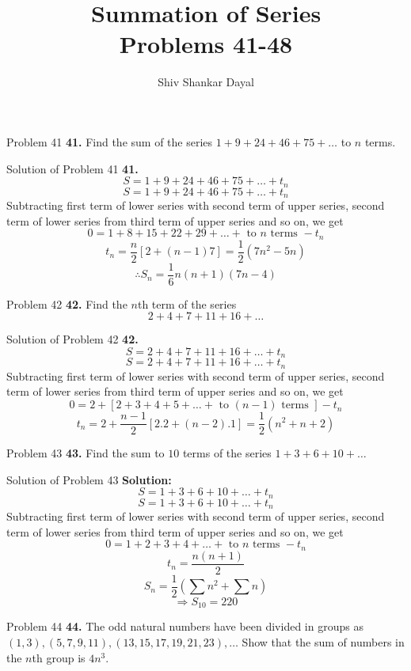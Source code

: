 \documentclass[aspectratio=1610,8pt]{beamer}
\title{Summation of Series\\Problems 41-48}
\author[Shiv Shankar Dayal]{Shiv Shankar Dayal}
\begin{document}
\begin{frame}
  \titlepage
\end{frame}
\begin{frame}{Problem 41}
  \textbf{41.} Find the sum of the series $1 + 9 + 24 + 46 + 75 + \ldots$ to $n$ terms.
\end{frame}
\begin{frame}{Solution of Problem 41}
  \textbf{41.} $$S = 1 + 9 + 24 + 46 + 75 + \ldots + t_n$$
  $$S = 1 + 9 + 24 + 46 + 75 + \ldots + t_n$$
  Subtracting first term of lower series with second term of upper series, second term of lower series from third term of upper
  series and so on, we get
  $$0= 1 + 8 + 15 + 22 + 29 + \ldots + \text{~to~}n\text{~terms~} - t_n$$
  $$t_n = \frac{n}{2}[2 + (n - 1)7] = \frac{1}{2}(7n^2 - 5n)$$
  $$\therefore S_n = \frac{1}{6}n(n + 1)(7n- 4)$$
\end{frame}
\begin{frame}{Problem 42}
  \textbf{42.} Find the $n$th term of the series $$2 + 4 + 7 + 11 + 16 + \ldots$$
\end{frame}
\begin{frame}{Solution of Problem 42}
  \textbf{42.} $$S = 2 + 4 + 7 + 11 + 16 + \ldots + t_n$$
  $$S = 2 + 4 + 7 + 11 + 16 + \ldots + t_n$$
  Subtracting first term of lower series with second term of upper series, second term of lower series from third term of upper
  series and so on, we get
  $$0 = 2 + [2 + 3 + 4 + 5 + \ldots + \text{~to~}(n - 1)\text{~terms~}] - t_n$$
  $$t_n = 2 + \frac{n - 1}{2}[2.2 + (n - 2).1] = \frac{1}{2}(n^2 + n + 2)$$
\end{frame}
\begin{frame}{Problem 43}
  \textbf{43.} Find the sum to $10$ terms of the series $1 + 3 + 6 + 10 + \ldots$
\end{frame}
\begin{frame}{Solution of Problem 43}
  \textbf{Solution:} $$S = 1 + 3 + 6 + 10 + \ldots + t_n$$
  $$S = 1 + 3 + 6 + 10 + \ldots + t_n$$
  Subtracting first term of lower series with second term of upper series, second term of lower series from third term of upper
  series and so on, we get
  $$0 = 1 + 2 + 3 + 4 + \ldots + \text{~to~}n\text{~terms~} - t_n$$
  $$t_n = \frac{n(n + 1)}{2}$$
  $$S_n = \frac{1}{2}\left(\sum n^2 + \sum n\right)$$
  $$\Rightarrow S_{10} = 220$$
\end{frame}
\begin{frame}{Problem 44}
  \textbf{44.} The odd natural numbers have been divided in groups as $(1, 3), (5, 7, 9, 11), (13, 15, 17, 19, 21, 23), \ldots$
  Show that the sum of numbers in the $n$th group is $4n^3.$
\end{frame}
\end{document}
